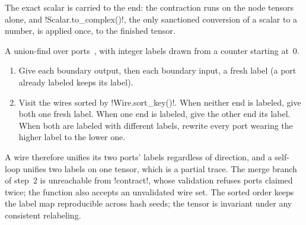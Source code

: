 The exact scalar is carried to the end: the contraction runs on the node tensors alone, and \py!Scalar.to_complex()!, the only sanctioned conversion of a scalar to a number, is applied once, to the finished tensor.

\begin{algorithm}\label{alg:semantics-labels}
A union-find over ports~\cite{tarjan1975unionfind}, with integer labels drawn from a counter starting at~0.
\begin{enumerate}
\item Give each boundary output, then each boundary input, a fresh label (a port already labeled keeps its label).
\item Visit the wires sorted by \py!Wire.sort_key()!. When neither end is labeled, give both one fresh label. When one end is labeled, give the other end its label. When both are labeled with different labels, rewrite every port wearing the higher label to the lower one.
\end{enumerate}
A wire therefore unifies its two ports' labels regardless of direction, and a self-loop unifies two labels on one tensor, which is a partial trace. The merge branch of step~2 is unreachable from \py!contract!, whose validation refuses ports claimed twice; the function also accepts an unvalidated wire set. The sorted order keeps the label map reproducible across hash seeds; the tensor is invariant under any consistent relabeling.
\end{algorithm}

